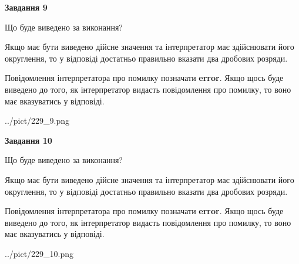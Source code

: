 \documentclass[12pt, ukrainian]{article}
\begin{document}
{\begin {Large}
{\begin {center}\textbf{Завдання 9}\end {center}}\par
Що буде виведено за виконання? \par

Якщо має бути виведено дійсне значення та інтерпретатор має здійснювати його округлення, 
то у відповіді достатньо правильно вказати два дробових розряди.

Повідомлення інтерпретатора про помилку позначати \textbf{error}.
Якщо щось буде виведено до того, як інтерпретатор видасть повідомлення про помилку, 
то воно має вказуватись у відповіді. \par

\begin{center}
	{../pict/229_9.png}
\end{center}
\newpage

{\begin {center}\textbf{Завдання 10}\end {center}}\par
Що буде виведено за виконання? \par

Якщо має бути виведено дійсне значення та інтерпретатор має здійснювати його округлення, 
то у відповіді достатньо правильно вказати два дробових розряди.

Повідомлення інтерпретатора про помилку позначати \textbf{error}.
Якщо щось буде виведено до того, як інтерпретатор видасть повідомлення про помилку, 
то воно має вказуватись у відповіді. \par

\begin{center}
	{../pict/229_10.png}
\end{center}
\newpage

\end {Large}}
\end{document}
